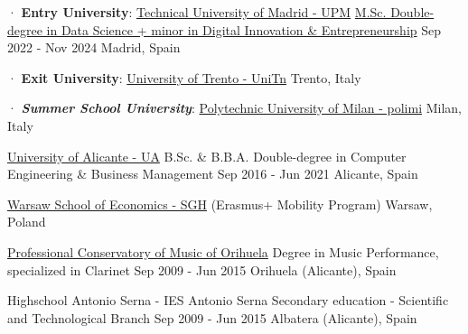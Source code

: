 

\begin{cventries}

  \cventry
    {· \textbf{Entry University}: \href{https://www.upm.es/}{Technical University of Madrid - UPM}} %
    {\href{https://masterschool.eitdigital.eu/data-science}{M.Sc. Double-degree in Data Science + minor in Digital Innovation \& Entrepreneurship}} %
    {Sep 2022 - Nov 2024} %
    {Madrid, Spain} %
    {}
    
  \cventrynew
	{· \textbf{Exit University}: \href{https://www.unitn.it/en}{University of Trento - UniTn}} %
	{} %
	{} %
	{Trento, Italy} %
	{}

  \cventrynewnew
	{· \textit{\textbf{Summer School University}}: \href{https://www.polimi.it/}{Polytechnic University of Milan - polimi}} %
	{} %
	{} %
	{Milan, Italy} %
	{}
	
  \cventrymod
	{\href{https://www.ua.es/}{University of Alicante - UA}} %
	{B.Sc. \&  B.B.A. Double-degree in Computer Engineering \& Business Management} %
	{Sep 2016 - Jun 2021} %
	{Alicante, Spain} %
	{}
	
  \cventrynew
	{\href{https://www.sgh.waw.pl/en}{Warsaw School of Economics - SGH}  (Erasmus+ Mobility Program)} %
	{} %
	{} %
	{Warsaw, Poland} %
	{}
	
  \cventrymod
	{\href{https://conservatorioorihuela.com/}{Professional Conservatory of Music of Orihuela}} %
	{Degree in Music Performance, specialized in Clarinet} %
	{Sep 2009 - Jun 2015} %
	{Orihuela (Alicante), Spain} %
	{}
		
  \cventry
	{Highschool Antonio Serna - IES Antonio Serna} %
	{Secondary education - Scientific and Technological Branch} %
	{Sep 2009 - Jun 2015} %
	{Albatera (Alicante), Spain} %
	{}
\end{cventries}
